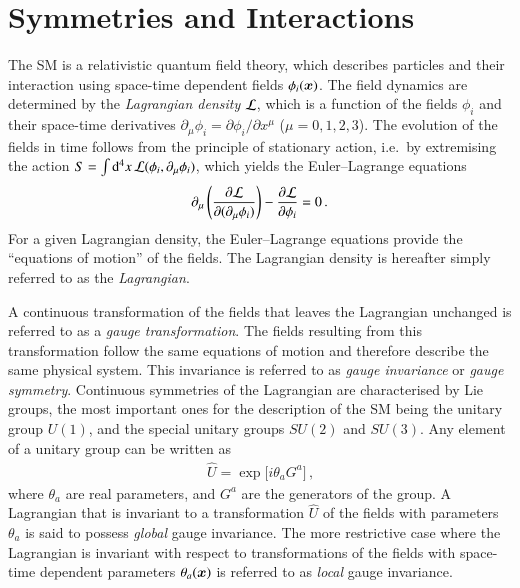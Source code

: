 \section{Symmetries and Interactions}%
\label{sec:theo_symmetries_interactions}

The SM is a relativistic quantum field theory, which describes particles and
their interaction using space-time dependent fields $\phi_i(\bm{x})$. The
field dynamics are determined by the \emph{Lagrangian density} $\mathcal{L}$,
which is a function of the fields $\phi_i$ and their space-time derivatives
$\partial_\mu \phi_i = \partial \phi_i / \partial x^\mu$ ($\mu = 0, 1, 2,
3$). The evolution of the fields in time follows from the principle of
stationary action, i.e.\ by extremising the action
$S = \int \mathrm{d}^4x \, \mathcal{L}(\phi_i, \partial_\mu \phi_i)$, which yields
the Euler--Lagrange equations
\begin{align*}
  \partial_{\mu} \left( \frac{\partial \mathcal{L}}{\partial (\partial_{\mu} \phi_i)} \right) - \frac{\partial \mathcal{L}}{\partial \phi_i} = 0 \,\text{.}
\end{align*}
For a given Lagrangian density, the Euler--Lagrange equations provide the
``equations of motion'' of the fields. The Lagrangian density is hereafter
simply referred to as the \emph{Lagrangian}.

A continuous transformation of the fields that leaves the Lagrangian unchanged
is referred to as a \emph{gauge transformation}. The fields resulting from this
transformation follow the same equations of motion and therefore describe the
same physical system. This invariance is referred to as \emph{gauge invariance}
or \emph{gauge symmetry}.
Continuous symmetries of the Lagrangian are characterised by Lie groups, the
most important ones for the description of the SM being the unitary group
$U(1)$, and the special unitary groups $SU(2)$ and $SU(3)$. Any element of a
unitary group can be written as
\begin{align*}
  \hat{U} = \exp\big[ i \theta_a G^a \big] \,\text{,}
\end{align*}
where $\theta_a$ are real parameters, and $G^a$ are the generators of the group.
A Lagrangian that is invariant to a transformation $\hat{U}$ of the fields with
parameters $\theta_a$ is said to possess \emph{global} gauge invariance. The
more restrictive case where the Lagrangian is invariant with respect to
transformations of the fields with space-time dependent parameters
$\theta_a(\bm{x})$ is referred to as \emph{local} gauge invariance.

